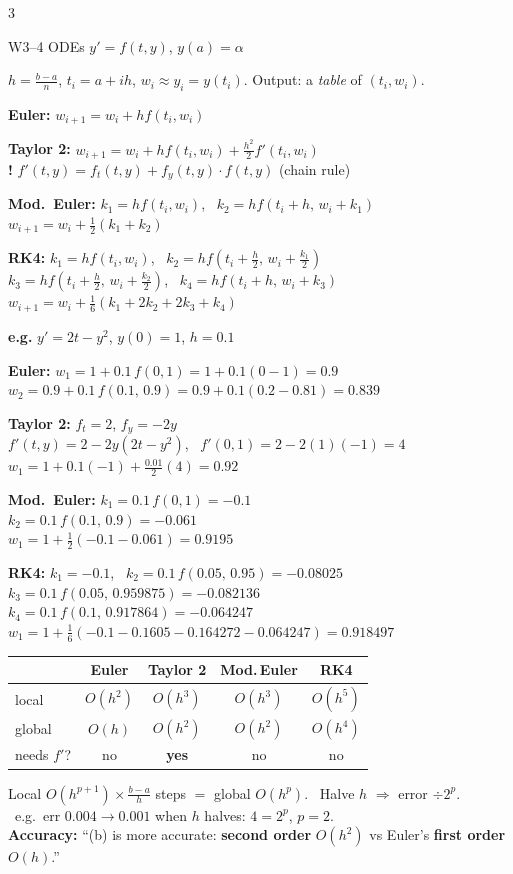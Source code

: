 \documentclass[8pt,a4paper]{extarticle}
\newcommand{\hd}[1]{\par\vspace{3pt}\noindent\colorbox{accent}{\parbox{\dimexpr\linewidth-2\fboxsep}{\color{white}\bfseries\strut #1}}\par\vspace{1pt}}
\newcommand{\sub}[1]{\textbf{\color{accent}#1}}
\newcommand{\warn}[1]{{\color{red}\textbf{!} #1}}
\newenvironment{ex}[1]{\par\vspace{2pt}\noindent\begin{lrbox}{\exbox}\begin{minipage}{\dimexpr\linewidth-2\fboxsep}\RaggedRight\color{grn}\textbf{e.g.} #1\par\setlength{\parskip}{1.5pt}}{\end{minipage}\end{lrbox}\colorbox{exbg}{\usebox{\exbox}}\par\vspace{1pt}}
\begin{document}
\begin{multicols*}{3}
\hd{W3--4 ODEs $y'=f(t,y)$, $y(a)=\alpha$}
$h=\frac{b-a}{n}$, $t_i=a+ih$, $w_i\approx y_i=y(t_i)$. Output: a \emph{table} of $(t_i,w_i)$.
\begin{tl}
\item \sub{Euler:} $w_{i+1}=w_i+hf(t_i,w_i)$
\item \sub{Taylor 2:} $w_{i+1}=w_i+hf(t_i,w_i)+\frac{h^2}{2}f'(t_i,w_i)$\\
\warn{$f'(t,y)=f_t(t,y)+f_y(t,y)\cdot f(t,y)$} (chain rule)
\item \sub{Mod.\ Euler:} $k_1=hf(t_i,w_i)$, \ $k_2=hf(t_i+h,\,w_i+k_1)$\\ $w_{i+1}=w_i+\frac12(k_1+k_2)$
\item \sub{RK4:} $k_1=hf(t_i,w_i)$, \ $k_2=hf(t_i+\frac h2,\,w_i+\frac{k_1}2)$\\ $k_3=hf(t_i+\frac h2,\,w_i+\frac{k_2}2)$, \ $k_4=hf(t_i+h,\,w_i+k_3)$\\ $w_{i+1}=w_i+\frac16(k_1+2k_2+2k_3+k_4)$
\end{tl}
\begin{ex}{$y'=2t-y^2$, $y(0)=1$, $h=0.1$}
\sub{Euler:} $w_1=1+0.1\,f(0,1)=1+0.1(0-1)=0.9$\\
$w_2=0.9+0.1\,f(0.1,\,0.9)=0.9+0.1(0.2-0.81)=0.839$

\sub{Taylor 2:} $f_t=2$, $f_y=-2y$\\
$f'(t,y)=2-2y(2t-y^2)$, \ $f'(0,1)=2-2(1)(-1)=4$\\
$w_1=1+0.1(-1)+\frac{0.01}{2}(4)=0.92$

\sub{Mod.\ Euler:} $k_1=0.1\,f(0,1)=-0.1$\\
$k_2=0.1\,f(0.1,\,0.9)=-0.061$\\
$w_1=1+\frac12(-0.1-0.061)=0.9195$

\sub{RK4:} $k_1=-0.1$, \ $k_2=0.1\,f(0.05,\,0.95)=-0.08025$\\
$k_3=0.1\,f(0.05,\,0.959875)=-0.082136$\\
$k_4=0.1\,f(0.1,\,0.917864)=-0.064247$\\
$w_1=1+\frac16(-0.1-0.1605-0.164272-0.064247)=0.918497$
\end{ex}
{\centering\begin{tabular}{@{}l@{\ \ }c@{\ \ }c@{\ \ }c@{\ \ }c@{}}
& Euler & Taylor 2 & Mod.\,Euler & RK4\\\hline
local & $O(h^2)$ & $O(h^3)$ & $O(h^3)$ & $O(h^5)$\\
global & $O(h)$ & $O(h^2)$ & $O(h^2)$ & $O(h^4)$\\
needs $f'$? & no & \textbf{yes} & no & no
\end{tabular}\par}
Local $O(h^{p+1})\times\frac{b-a}{h}$ steps $=$ global $O(h^p)$. \ Halve $h$ $\Rightarrow$ error $\div2^p$. \ {\color{grn}e.g.\ err $0.004\to0.001$ when $h$ halves: $4=2^p$, $p=2$.}\\
\sub{Accuracy:} ``(b) is more accurate: \textbf{second order} $O(h^2)$ vs Euler's \textbf{first order} $O(h)$.''


\end{multicols*}
\end{document}
